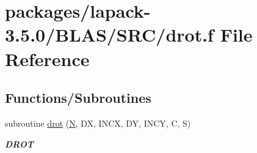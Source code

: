 \hypertarget{lapack-3_85_80_2BLAS_2SRC_2drot_8f}{}\section{packages/lapack-\/3.5.0/\+B\+L\+A\+S/\+S\+R\+C/drot.f File Reference}
\label{lapack-3_85_80_2BLAS_2SRC_2drot_8f}
\subsection*{Functions/\+Subroutines}
\begin{DoxyCompactItemize}
\item 
subroutine \hyperlink{group__double__blas__level1_ga54d516b6e0497df179c9831f2554b1f9}{drot} (\hyperlink{polmisc_8c_a0240ac851181b84ac374872dc5434ee4}{N}, D\+X, I\+N\+C\+X, D\+Y, I\+N\+C\+Y, C, S)
\begin{DoxyCompactList}\small\item\em {\bfseries D\+R\+O\+T} \end{DoxyCompactList}\end{DoxyCompactItemize}
